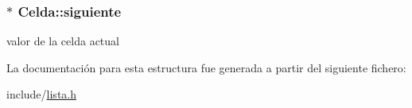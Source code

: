 \subsubsection[{siguiente}]{$\ast$ Celda\+::siguiente}\label{struct_celda_a5c6d6d20b0c0b0a359715844955a0078}


valor de la celda actual 



La documentación para esta estructura fue generada a partir del siguiente fichero\+:\begin{DoxyCompactItemize}
\item 
include/\hyperlink{lista_8h}{lista.\+h}\end{DoxyCompactItemize}
